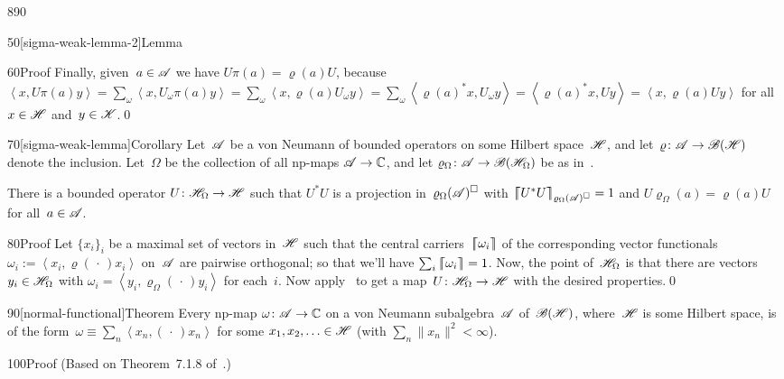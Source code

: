 \begin{parsec}{890}
\begin{point}{50}[sigma-weak-lemma-2]{Lemma}
\begin{point}{60}{Proof}
Finally,
given~$a\in\mathscr{A}$
we have $U\pi(a)=\varrho(a)U$,
because $\left<x,U\pi(a)y\right>
= \sum_\omega \left<x,U_\omega \pi(a)y\right>
= \sum_\omega \left<x,\varrho(a) U_\omega y\right>
= \sum_\omega \left<\varrho(a)^* x, U_\omega y\right>
= \left<\varrho(a)^* x, U y\right>
= \left<x, \varrho(a) U y\right>$
for all~$x\in\mathscr{H}$ and~$y\in\mathscr{K}$.\qed
\end{point}
\end{point}
\begin{point}{70}[sigma-weak-lemma]{Corollary}%
Let~$\mathscr{A}$ be a von Neumann 
of bounded operators on some Hilbert space~$\mathscr{H}$,
and let~$\varrho\colon \mathscr{A}\to\mathscr{B}(\mathscr{H})$
denote the inclusion.
Let~$\Omega$ be the collection of all np-maps $\mathscr{A}\to\mathbb{C}$,
and let $\varrho_\Omega\colon \mathscr{A}\to\mathscr{B}(\mathscr{H}_\Omega)$
be as in~.

There is a bounded operator $U\colon \mathscr{H}_\Omega\to\mathscr{H}$
such that $U^*U$ is a projection
in~$\varrho_\Omega(\mathscr{A})^\square$
with 
$\left\lceil\!\!\left\lceil U^*U\right\rceil\!\!\right\rceil_{\varrho_\Omega(\mathscr{A})^\square}=1$
and
$U\varrho_\Omega(a)= \varrho(a) U$
for all~$a\in\mathscr{A}$.
\begin{point}{80}{Proof}%
Let $\{x_i\}_i$ be a maximal set of vectors
in~$\mathscr{H}$ 
such that the 
central carriers~$\left\lceil\!\!\left\lceil\omega_i\right\rceil\!\!\right\rceil$
of the corresponding vector functionals
$\omega_i :=\left<x_i,\varrho(\,\cdot\,)x_i\right>$
on~$\mathscr{A}$
are pairwise orthogonal;
so that we'll 
have $\sum_i \left\lceil\!\!\left\lceil\omega_i\right\rceil\!\!\right\rceil=1$.
Now, the point of~$\mathscr{H}_\Omega$ 
is that there are vectors $y_i\in\mathscr{H}_\Omega$
with $\omega_i=\left<y_i,\varrho_\Omega(\,\cdot\,)y_i\right>$
for each~$i$.
Now apply~
to get a map~$U\colon \mathscr{H}_\Omega\to \mathscr{H}$
with the desired properties.\qed
\end{point}
\end{point}
\begin{point}{90}[normal-functional]{Theorem}%
%
%
Every np-map $\omega\colon \mathscr{A}\to\mathbb{C}$
on a von Neumann subalgebra~$\mathscr{A}$
of~$\mathscr{B}(\mathscr{H})$,
where~$\mathscr{H}$ is some Hilbert space,
is of the 
form~$\omega \equiv \sum_n \left<x_n,(\,\cdot\,)x_n\right>$
for some $x_1,x_2,\dotsc \in\mathscr{H}$
(with $\sum_n\|x_n\|^2<\infty$).
\begin{point}{100}{Proof}%
(Based on Theorem~7.1.8 of~\cite{kr}.)


\end{point}
\end{point}
\end{parsec}
